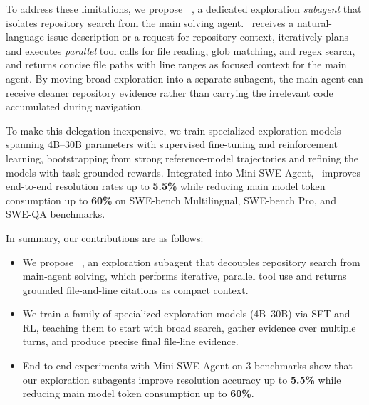 \documentclass{llmxive}
\providecommand{\approach}{~}
\begin{document}
To address these limitations, we propose \textbf{\approach}, a dedicated exploration \emph{subagent} that isolates repository search from the main solving agent.
\approach receives a natural-language issue description or a request for repository context, iteratively plans and executes \emph{parallel} tool calls for file reading, glob matching, and regex search, and returns concise file paths with line ranges as focused context for the main agent.
By moving broad exploration into a separate subagent, the main agent can receive cleaner repository evidence rather than carrying the irrelevant code accumulated during navigation.

To make this delegation inexpensive, we train specialized exploration models spanning 4B--30B parameters with supervised fine-tuning and reinforcement learning, bootstrapping from strong reference-model trajectories and refining the models with task-grounded rewards.
Integrated into Mini-SWE-Agent, \approach improves end-to-end resolution rates up to \textbf{5.5\%} while reducing main model token consumption up to \textbf{60\%} on SWE-bench Multilingual, SWE-bench Pro, and SWE-QA benchmarks.

In summary, our contributions are as follows:
\begin{itemize}
\vspace{-2mm}
  \item We propose \approach, an exploration subagent that decouples repository search from main-agent solving, which performs iterative, parallel tool use and returns grounded file-and-line citations as compact context.
  \vspace{-2mm}
  \item We train a family of specialized exploration models (4B--30B) via SFT and RL, teaching them to start with broad search, gather evidence over multiple turns, and produce precise final file-line evidence.
  \vspace{-2mm}
  \item End-to-end experiments with Mini-SWE-Agent on 3 benchmarks show that our exploration subagents improve resolution accuracy up to \textbf{5.5\%} while reducing main model token consumption up to \textbf{60\%}.
\end{itemize}
\end{document}
